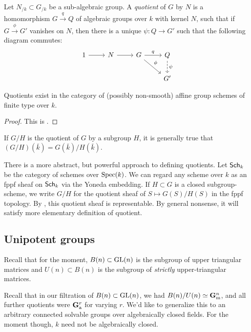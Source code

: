 \begin{definition}
Let $N_{/k}\subset G_{/k}$ be a sub-algebraic group. A \emph{quotient} of $G$ 
by $N$ is a homomorphism $G\xrightarrow q Q$ of algebraic groups over $k$ with kernel $N$, 
such that if $G\xrightarrow\phi G'$ vanishes on $N$, then there is a unique 
$\psi:Q\to G'$ such that the following diagram commutes:
\[\begin{tikzcd}
  1 \ar[r] 
    & N \ar[r] 
    & G \ar[r, "q"] \ar[dr, "\phi"]
    & Q \ar[d, "\psi", dashrightarrow] \\
  & & & G'
\end{tikzcd}\]
\end{definition}

\begin{theorem}
Quotients exist in the category of (possibly non-smooth) affine group schemes 
of finite type over $k$. 
\end{theorem}
\begin{proof}
This is \cite[VII 8.1]{milne-AGS}. 
\end{proof}

If $G/H$ is the quotient of $G$ by a subgroup $H$, it is generally true that 
$(G/H)(\bar k)=G(\bar k)/H(\bar k)$. 

\begin{hard}
There is a more abstract, but powerful approach to defining quotients. 
Let $\mathsf{Sch}_{k}$ be the category of schemes over $\operatorname{Spec}(k)$. We can regard 
any scheme over $k$ as an fppf sheaf on $\mathsf{Sch}_{k}$ via the Yoneda embedding. 
If $H\subset G$ is a closed subgroup-scheme, we write $G/H$ for the quotient 
sheaf of $S\mapsto G(S)/H(S)$ in the fppf topology. By 
\cite[VI\textsubscript{A} 3.2]{sga3-i}, this quotient sheaf is representable. 
By general nonsense, it will satisfy more elementary definition of quotient. 
\end{hard}





\subsection{Unipotent groups}

Recall that for the moment, $B(n)\subset \operatorname{GL}(n)$ is the subgroup of upper 
triangular matrices and $U(n)\subset B(n)$ is the subgroup of \emph{strictly} 
upper-triangular matrices. 

Recall that in our filtration of $B(n)\subset \operatorname{GL}(n)$, we had 
$B(n)/U(n)\simeq \mathbf{G}_\mathrm{m}^n$, and all further quotients were $\mathbf{G}_\mathrm{a}^r$ for varying 
$r$. We'd like to generalize this to an arbitrary connected solvable groups 
over algebraically closed fields. For the moment though, $k$ need not be 
algebraically closed. 

